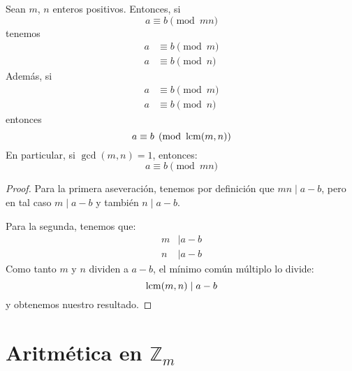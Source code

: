   \begin{theorem}
    \label{theo:congruencia-mn}
    Sean \(m\), \(n\) enteros positivos.
    Entonces,
    si
    \begin{equation*}
      a \equiv b \pmod{m n}
    \end{equation*}
    tenemos
    \begin{align*}
      a &\equiv b \pmod{m} \\
      a &\equiv b \pmod{n}
    \end{align*}
    Además,
    si
    \begin{align*}
      a &\equiv b \pmod{m} \\
      a &\equiv b \pmod{n}
    \end{align*}
    entonces
    \begin{equation*}
      a \equiv b \pmod{\operatorname{lcm}(m, n)}
    \end{equation*}
    En particular,
    si \(\gcd(m, n) = 1\),
    entonces:
    \begin{equation*}
      a \equiv b \pmod{m n}
    \end{equation*}
  \end{theorem}
  \begin{proof}
    Para la primera aseveración,
    tenemos por definición que \(m n \mid a - b\),
    pero en tal caso \(m \mid a - b\)
    y también \(n \mid a - b\).

    Para la segunda,
    tenemos que:
    \begin{align*}
      m &\mid a - b \\
      n &\mid a - b
    \end{align*}
    Como tanto \(m\) y \(n\) dividen a \(a - b\),
    el mínimo común múltiplo lo divide:
    \begin{equation*}
      \operatorname{lcm}(m, n) \mid a - b
    \end{equation*}
    y obtenemos nuestro resultado.
  \end{proof}


\section[Aritmética \texorpdfstring{en $\mathbb{Z}_m$}{con congruencias}]
	{\protect\boldmath
	   Aritmética \texorpdfstring{en $\mathbb{Z}_m$}{con congruencias}%
       \protect\unboldmath}
\label{sec:aritmetica-Zm}

